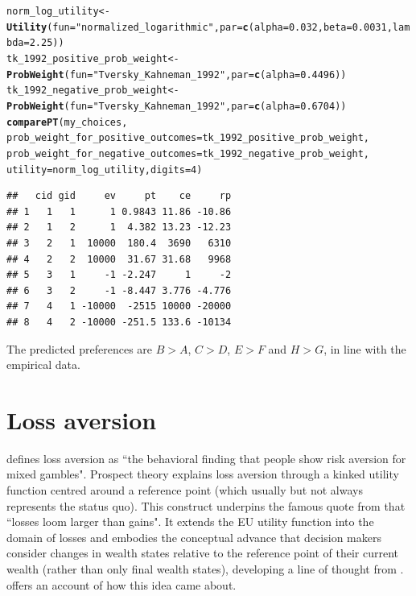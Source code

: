 \documentclass{article}\usepackage[]{graphicx}\usepackage[]{color}
\makeatletter
\newcommand{\hlnum}[1]{\textcolor[rgb]{0.686,0.059,0.569}{#1}}%
\newcommand{\hlstr}[1]{\textcolor[rgb]{0.192,0.494,0.8}{#1}}%
\newcommand{\hlstd}[1]{\textcolor[rgb]{0.345,0.345,0.345}{#1}}%
\newcommand{\hlkwb}[1]{\textcolor[rgb]{0.69,0.353,0.396}{#1}}%
\newcommand{\hlkwc}[1]{\textcolor[rgb]{0.333,0.667,0.333}{#1}}%
\newcommand{\hlkwd}[1]{\textcolor[rgb]{0.737,0.353,0.396}{\textbf{#1}}}%
\newenvironment{kframe}{%
 \def\at@end@of@kframe{}%
 \ifinner\ifhmode%
  \def\at@end@of@kframe{\end{minipage}}%
  \begin{minipage}{\columnwidth}%
 \fi\fi%
 \def\FrameCommand##1{\hskip\@totalleftmargin \hskip-\fboxsep
 \colorbox{shadecolor}{##1}\hskip-\fboxsep
     \hskip-\linewidth \hskip-\@totalleftmargin \hskip\columnwidth}%
 \MakeFramed {\advance\hsize-\width
   \@totalleftmargin\z@ \linewidth\hsize
   \@setminipage}}%
 {\par\unskip\endMakeFramed%
 \at@end@of@kframe}
\newenvironment{knitrout}{}{} %
\makeatother
\begin{document}
\begin{knitrout}
\color{fgcolor}\begin{kframe}
\begin{alltt}
\hlstd{norm_log_utility} \hlkwb{<-} \hlkwd{Utility}\hlstd{(}\hlkwc{fun}\hlstd{=}\hlstr{"normalized_logarithmic"}\hlstd{,} \hlkwc{par}\hlstd{=}\hlkwd{c}\hlstd{(}\hlkwc{alpha}\hlstd{=}\hlnum{0.032}\hlstd{,} \hlkwc{beta}\hlstd{=}\hlnum{0.0031}\hlstd{,} \hlkwc{lambda}\hlstd{=}\hlnum{2.25}\hlstd{))}
\hlstd{tk_1992_positive_prob_weight} \hlkwb{<-} \hlkwd{ProbWeight}\hlstd{(}\hlkwc{fun}\hlstd{=}\hlstr{"Tversky_Kahneman_1992"}\hlstd{,} \hlkwc{par}\hlstd{=}\hlkwd{c}\hlstd{(}\hlkwc{alpha}\hlstd{=}\hlnum{0.4496}\hlstd{))}
\hlstd{tk_1992_negative_prob_weight} \hlkwb{<-} \hlkwd{ProbWeight}\hlstd{(}\hlkwc{fun}\hlstd{=}\hlstr{"Tversky_Kahneman_1992"}\hlstd{,} \hlkwc{par}\hlstd{=}\hlkwd{c}\hlstd{(}\hlkwc{alpha}\hlstd{=}\hlnum{0.6704}\hlstd{))}
\hlkwd{comparePT}\hlstd{(my_choices,}
        \hlkwc{prob_weight_for_positive_outcomes}\hlstd{=tk_1992_positive_prob_weight,}
        \hlkwc{prob_weight_for_negative_outcomes}\hlstd{=tk_1992_negative_prob_weight,}
        \hlkwc{utility}\hlstd{=norm_log_utility,} \hlkwc{digits}\hlstd{=}\hlnum{4}\hlstd{)}
\end{alltt}
\begin{verbatim}
##   cid gid     ev     pt    ce     rp
## 1   1   1      1 0.9843 11.86 -10.86
## 2   1   2      1  4.382 13.23 -12.23
## 3   2   1  10000  180.4  3690   6310
## 4   2   2  10000  31.67 31.68   9968
## 5   3   1     -1 -2.247     1     -2
## 6   3   2     -1 -8.447 3.776 -4.776
## 7   4   1 -10000  -2515 10000 -20000
## 8   4   2 -10000 -251.5 133.6 -10134
\end{verbatim}
\end{kframe}
\end{knitrout}


The predicted preferences are $B > A$, $C > D$, $E > F$ and $H > G$, in line with the empirical data.

\section{Loss aversion}

\citet[][p. 466]{Birnbaum_2008} defines loss aversion as ``the behavioral finding that people show risk
aversion for mixed gambles".
Prospect theory explains loss aversion through a kinked utility function centred around a reference point (which usually but not always represents the status quo).
This construct underpins the famous quote from \citet[][p. 279]{Kahneman_Tversky_1979} that ``losses loom larger than gains". It extends the EU utility function into the domain of losses and embodies the conceptual advance that decision makers consider changes in wealth states
relative to the reference point of their current wealth (rather than only final wealth states), developing a line of thought from \cite{Markowitz_1952}. \citet[][p. 269-277]{Kahneman_2011} offers an account of how this idea came about.
\end{document}
